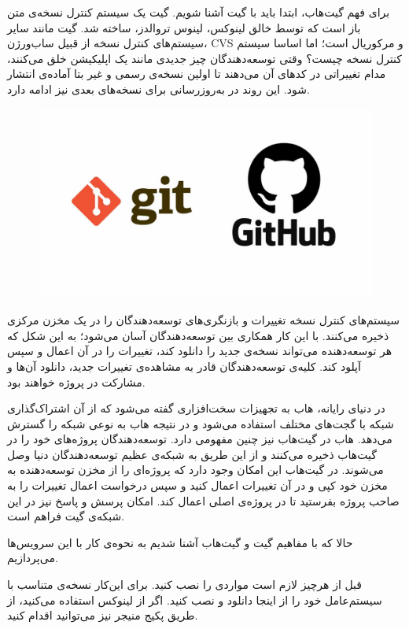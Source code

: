
برای فهم گیت‌هاب، ابتدا باید با گیت آشنا شویم. گیت یک سیستم کنترل نسخه‌ی متن‌ باز است که توسط خالق لینوکس، لینوس تروالدز، ساخته شد. گیت مانند سایر سیستم‌های کنترل نسخه از قبیل ساب‌ورژن، CVS و مرکوریال است؛ اما اساسا سیستم کنترل نسخه چیست؟ وقتی توسعه‌دهندگان چیز جدیدی مانند یک اپلیکیشن خلق می‌کنند، مدام تغییراتی در کدهای آن می‌دهند تا اولین نسخه‌ی رسمی و غیر بتا آماده‌ی انتشار شود. این روند در به‌روزرسانی برای نسخه‌های بعدی نیز ادامه دارد.

\begin{figure}[!h]
	\centering
	\includegraphics[width=0.7\linewidth]{Assets/gitandgithub.jpg}
\end{figure}


سیستم‌های کنترل نسخه تغییرات و بازنگری‌های توسعه‌دهندگان را در یک مخزن مرکزی ذخیره می‌کنند. با این کار همکاری بین توسعه‌دهندگان آسان می‌شود؛ به این شکل که هر توسعه‌دهنده می‌تواند نسخه‌ی جدید را دانلود کند، تغییرات را در آن اعمال و سپس آپلود کند. کلیه‌ی توسعه‌دهندگان قادر به مشاهده‌ی تغییرات جدید، دانلود آن‌ها و مشارکت در پروژه خواهند بود.

در دنیای رایانه، هاب به تجهیزات سخت‌افزاری گفته می‌شود که از آن اشتراک‌گذاری شبکه با گجت‌های مختلف استفاده می‌شود و در نتیجه هاب به نوعی شبکه را گسترش می‌دهد. هاب در گیت‌هاب نیز چنین مفهومی دارد. توسعه‌دهندگان پروژه‌های خود را در گیت‌هاب ذخیره می‌کنند و از این طریق به شبکه‌ی عظیم توسعه‌دهندگان دنیا وصل می‌شوند. در گیت‌هاب این امکان وجود دارد که پروژه‌ای را از مخزن توسعه‌دهنده به مخزن خود کپی و در آن تغییرات اعمال کنید و سپس درخواست اعمال تغییرات را به صاحب پروژه بفرستید تا در پروژه‌ی اصلی اعمال کند. امکان پرسش و پاسخ نیز در این شبکه‌ی گیت فراهم است.

حالا که با مفاهیم گیت و گیت‌هاب آشنا شدیم به نحوه‌ی کار با این سرویس‌ها می‌پردازیم.

قبل از هرچیز لازم است مواردی را نصب کنید. برای این‌کار نسخه‌ی متناسب با سیستم‌عامل خود را از اینجا دانلود و نصب کنید. اگر از لینوکس استفاده می‌کنید، از طریق پکیج منیجر نیز می‌توانید اقدام کنید.

